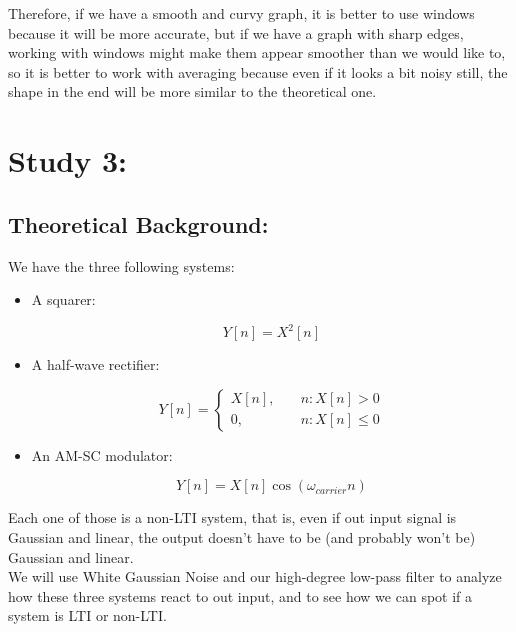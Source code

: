 \documentclass[a4paper,11pt]{article}
\begin{document}
Therefore, if we have a smooth and curvy graph, it is better to use windows
because it will be more accurate, but if we have a graph with sharp edges,
working with windows might make them appear smoother than we would like to,
so it is better to work with averaging because even if it looks a bit noisy
still, the shape in the end will be more similar to the theoretical one.

\newpage

\section{Study 3:}

\subsection{Theoretical Background:}

We have the three following systems:

\begin{itemize}

\item A squarer:

\begin{equation}\label{eq:Squarer}
  Y[n] = X^2[n]
\end{equation}

\item A half-wave rectifier:

\begin{equation}\label{eq:HW}
  Y[n] =
    \begin{cases}
        X[n], &\quad n: X[n] > 0\\
        0,    &\quad n: X[n] \leq 0
    \end{cases}
\end{equation}

\item An AM-SC modulator:

\begin{equation}\label{eq:AMSC}
  Y[n] = X[n]\cos(\omega_{carrier} n)
\end{equation}

\end{itemize}

Each one of those is a non-LTI system, that is, even if out input signal is
Gaussian and linear, the output doesn't have to be (and probably won't be)
Gaussian and linear. \\

We will use White Gaussian Noise and our high-degree low-pass filter to analyze
how these three systems react to out input, and to see how we can spot if a
system is LTI or non-LTI.\\
\end{document}
